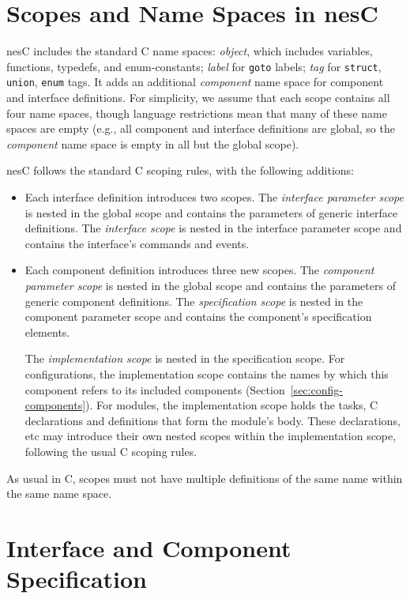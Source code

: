 \documentclass[11pt,letterpaper]{article}
\newcommand{\kw}[1]{{\tt #1}}
\newcommand{\nesc}{nesC\xspace}
\begin{document}
\section{Scopes and Name Spaces in \nesc}
\label{sec:scoping}

\nesc includes the standard C name spaces: \emph{object}, which includes
variables, functions, typedefs, and enum-constants; \emph{label} for
\kw{goto} labels; \emph{tag} for \kw{struct}, \kw{union}, \kw{enum} tags.
It adds an additional \emph{component} name space for component and
interface definitions. For simplicity, we assume that each scope contains
all four name spaces, though language restrictions mean that many of these
name spaces are empty (e.g., all component and interface definitions are
global, so the \emph{component} name space is empty in all but the global
scope).

\nesc follows the standard C scoping rules, with the following
additions:
\begin{itemize}
\item Each interface definition introduces two scopes. The \emph{interface
parameter scope} is nested in the global scope and contains the parameters
of generic interface definitions. The \emph{interface scope} is nested in
the interface parameter scope and contains the interface's commands and
events.

\item Each component definition introduces three new scopes. The
\emph{component parameter scope} is nested in the global scope and contains
the parameters of generic component definitions. The \emph{specification
scope} is nested in the component parameter scope and contains the
component's specification elements. 

The \emph{implementation scope} is nested in the specification scope.  For
configurations, the implementation scope contains the names by which this
component refers to its included components
(Section~\ref{sec:config-components}). For modules, the implementation
scope holds the tasks, C declarations and definitions that form the
module's body. These declarations, etc may introduce their own nested
scopes within the implementation scope, following the usual C scoping
rules.
\end{itemize}
As usual in C, scopes must not have multiple definitions of the same
name within the same name space.

\section{Interface and Component Specification}
\label{sec:interface}
\end{document}
